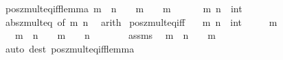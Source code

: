 \begin{isabellebody}
\endisatagproof
{\isafoldproof}%
%
\isadelimproof
\isanewline
%
\endisadelimproof
\isanewline
{}\isamarkupfalse%
\ pos{\isacharunderscore}{\kern0pt}zmult{\isacharunderscore}{\kern0pt}eq{\isacharunderscore}{\kern0pt}{}{\isacharunderscore}{\kern0pt}iff{\isacharunderscore}{\kern0pt}lemma{\isacharcolon}{\kern0pt}\ {\isachardoublequoteopen}m\ {\isacharasterisk}{\kern0pt}\ n\ {\isacharequal}{\kern0pt}\ {}\ {\isasymLongrightarrow}\ m\ {\isacharequal}{\kern0pt}\ {}\ {\isasymor}\ m\ {\isacharequal}{\kern0pt}\ {\isacharminus}{\kern0pt}\ {}{\isachardoublequoteclose}\isanewline
\ \ \ m\ n\ {\isacharcolon}{\kern0pt}{\isacharcolon}{\kern0pt}\ int\isanewline
%
\isadelimproof
\ \ %
\endisadelimproof
%
\isatagproof
{}\isamarkupfalse%
\ abs{\isacharunderscore}{\kern0pt}zmult{\isacharunderscore}{\kern0pt}eq{\isacharunderscore}{\kern0pt}{}\ {\isacharbrackleft}{\kern0pt}of\ m\ n{\isacharbrackright}{\kern0pt}\ \isamarkupfalse%
\ arith%
\endisatagproof
{\isafoldproof}%
%
\isadelimproof
\isanewline
%
\endisadelimproof
\isanewline
{}\isamarkupfalse%
\ pos{\isacharunderscore}{\kern0pt}zmult{\isacharunderscore}{\kern0pt}eq{\isacharunderscore}{\kern0pt}{}{\isacharunderscore}{\kern0pt}iff{\isacharcolon}{\kern0pt}\isanewline
\ \ \ m\ n\ {\isacharcolon}{\kern0pt}{\isacharcolon}{\kern0pt}\ int\isanewline
\ \ \ {\isachardoublequoteopen}{}\ {\isacharless}{\kern0pt}\ m{\isachardoublequoteclose}\isanewline
\ \ \ {\isachardoublequoteopen}m\ {\isacharasterisk}{\kern0pt}\ n\ {\isacharequal}{\kern0pt}\ {}\ {\isasymlongleftrightarrow}\ m\ {\isacharequal}{\kern0pt}\ {}\ {\isasymand}\ n\ {\isacharequal}{\kern0pt}\ {}{\isachardoublequoteclose}\isanewline
%
\isadelimproof
%
\endisadelimproof
%
\isatagproof
{}\isamarkupfalse%
\ {\isacharminus}{\kern0pt}\isanewline
\ \ \isamarkupfalse%
\ assms\ \isamarkupfalse%
\ {\isachardoublequoteopen}m\ {\isacharasterisk}{\kern0pt}\ n\ {\isacharequal}{\kern0pt}\ {}\ {\isasymLongrightarrow}\ m\ {\isacharequal}{\kern0pt}\ {}{\isachardoublequoteclose}\isanewline
\ \ \ \ \isamarkupfalse%
\ {\isacharparenleft}{\kern0pt}auto\ dest{\isacharcolon}{\kern0pt}\ pos{\isacharunderscore}{\kern0pt}zmult{\isacharunderscore}{\kern0pt}eq{\isacharunderscore}{\kern0pt}{}{\isacharunderscore}{\kern0pt}iff{\isacharunderscore}{\kern0pt}lemma{\isacharparenright}{\kern0pt}\isanewline

\end{isabellebody}
